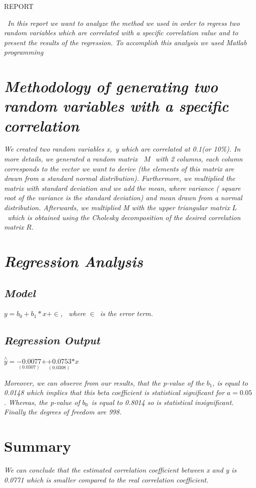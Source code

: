 \documentclass{article}
\begin{document}
\begin{center}
{\LARGE REPORT \ }\emph{\ \ }\ \ \ \ \ \ \ 
\end{center}

\textit{\ In this report we want to analyze the method we used in order to
regress two random variables which are correlated with a specific
correlation value and to present the results of the regression. To
accomplish this analysis we used Matlab programming\ \ \ \ \ \ \ \ \ \ \ \ \
\ \ \ \ \ \ \ \ \ \ \ \ \ \ \ \ \ \ \ \ \ \ \ \ \ \ \ \ \ \ \ \ \ \ \ \ \ \
\ \ \ \ \ \ \ }

\section{\textit{Methodology of generating two random variables with a
specific correlation \ \ \ \ \ }}

\textit{We created two random variables x,\ y which are correlated at 0.1(or
10\%). In more details, we generated a random matrix \ }$M\ $\textit{\ with
2 columns, each column corresponds to the vector we want to derive (the
elements of this matrix are drawn from a standard normal distribution).
Furthermore, we multiplied the matrix with standard deviation and we add the
mean, where variance ( square root of the variance is the standard
deviation) and mean drawn from a normal distribution. Afterwards, we
multiplied M with the upper triangular matrix }$L$\textit{\ which is
obtained using the Cholesky decomposition of the desired correlation matrix }%
$R$\textit{.}

\section{\textit{Regression Analysis}}

\subsection{\textit{Model}}

$y=b_{0}+b_{1}\ast x+\in $\textit{, \ where }$\in $\textit{\ is the error
term.}

\subsection{\textit{Regression Output}}

$\overset{\wedge }{y}\mathit{=}\underset{(0.0307)}{-0.0077}\mathit{+}%
\underset{(0.0308)}{+0.0753}\mathit{\ast x}$

\textit{Moreover, we can observe from our results, that the p-value of the }$%
b_{1}$\textit{, is equal to 0.0148 which implies that this beta coefficient
is statistical significant for }$a=0.05$\textit{. Whereas, the p-value of }$%
b_{0}$\textit{\ is equal to 0.8014 so is statistical insignificant. Finally
the degrees of freedom are 998.}

\section{Summary}

\textit{We can conclude that the estimated correlation coefficient between x
and y is 0.0771 which is smaller compared  to the real correlation
coefficient. }
\end{document}
